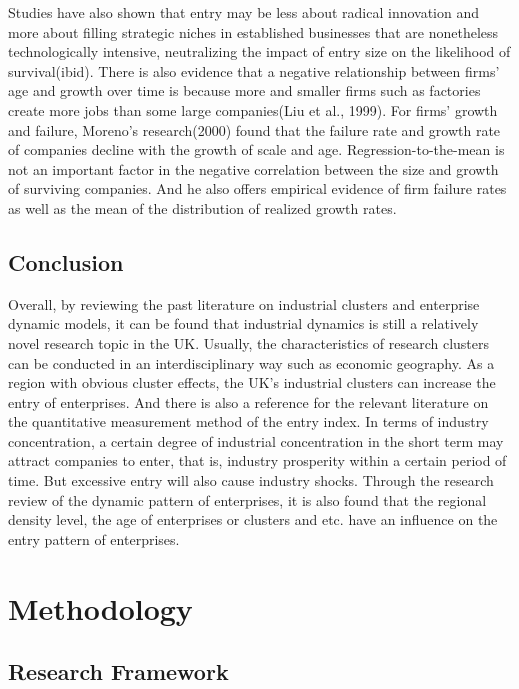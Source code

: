 \documentclass[
  12pt,
  oneside]{book}
\begin{document}
Studies have also shown that entry may be less about radical innovation and more about filling strategic niches in established businesses that are nonetheless technologically intensive, neutralizing the impact of entry size on the likelihood of survival(ibid). There is also evidence that a negative relationship between firms' age and growth over time is because more and smaller firms such as factories create more jobs than some large companies(Liu et al., 1999). For firms' growth and failure, Moreno's research(2000) found that the failure rate and growth rate of companies decline with the growth of scale and age. Regression-to-the-mean is not an important factor in the negative correlation between the size and growth of surviving companies. And he also offers empirical evidence of firm failure rates as well as the mean of the distribution of realized growth rates.

\hypertarget{conclusion}{%
\section{Conclusion}\label{conclusion}}

Overall, by reviewing the past literature on industrial clusters and enterprise dynamic models, it can be found that industrial dynamics is still a relatively novel research topic in the UK. Usually, the characteristics of research clusters can be conducted in an interdisciplinary way such as economic geography. As a region with obvious cluster effects, the UK's industrial clusters can increase the entry of enterprises. And there is also a reference for the relevant literature on the quantitative measurement method of the entry index. In terms of industry concentration, a certain degree of industrial concentration in the short term may attract companies to enter, that is, industry prosperity within a certain period of time. But excessive entry will also cause industry shocks. Through the research review of the dynamic pattern of enterprises, it is also found that the regional density level, the age of enterprises or clusters and etc. have an influence on the entry pattern of enterprises.

\hypertarget{methodology}{%
\chapter{Methodology}\label{methodology}}

\hypertarget{research-framework}{%
\section{Research Framework}\label{research-framework}}
\end{document}
